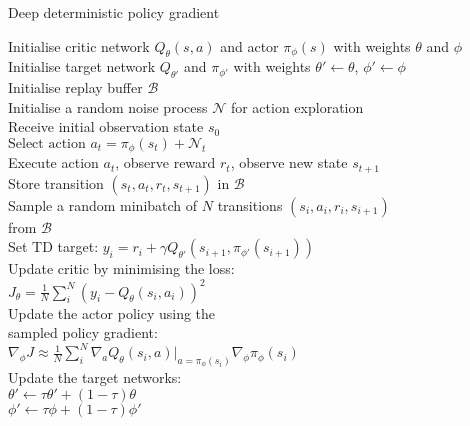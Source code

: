 \begin{algorithm}[htb!]
\SetAlgoLined
\caption{Deep deterministic policy gradient}\label{alg:ddpg}
Initialise critic network $Q_{\theta}(s,a)$ and actor $\pi_{\phi}(s)$ with weights $\theta$ and $\phi$ \\
Initialise target network $Q_{\theta'}$ and $\pi_{\phi'}$ with weights $\theta' \leftarrow \theta$, $\phi' \leftarrow \phi$ \\
Initialise replay buffer $\mathcal{B}$ \\
{
    Initialise a random noise process $\mathcal{N}$ for action exploration \\
    Receive initial observation state $s_0$\\
    {
        $\text{Select action } a_t = \pi_{\phi}(s_t) + \mathcal{N}_t$\\
        Execute action $a_t$, observe reward $r_t$, observe new state $s_{t+1}$ \\
        Store transition $(s_t, a_t, r_t, s_{t+1})$ in $\mathcal{B}$ \\
        Sample a random minibatch of $N$ transitions $(s_i, a_i, r_i, s_{i+1})$ \\
        \nonl from $\mathcal{B}$ \\
        Set TD target: $y_i = r_i + \gamma Q_{\theta'}(s_{i+1}, \pi_{\phi'}(s_{i+1}))$ \\
        Update critic by minimising the loss: \hspace{1.72cm}
             \\
        \nonl  $J_{\theta}=\frac{1}{N} \sum_{i}^{N} (y_i - Q_{\theta}(s_i,a_i))^2 $ \\
        Update the actor policy using the \\
        \nonl sampled policy gradient: \hspace{4cm}
             \\
        \nonl $\nabla_{\phi} J \approx \frac{1}{N} \sum_{i}^{N} \nabla_{a} Q_{\theta}(s_i,a)|_{a=\pi_{\phi}(s_i)} \nabla_{\phi} \pi_{\phi}(s_i) $\\
        Update the target networks:\\
        $\theta' \leftarrow \tau \theta' + (1 - \tau) \theta$\\
        $\phi' \leftarrow \tau \phi + (1 - \tau) \phi'$\\
    }
}
\end{algorithm}


